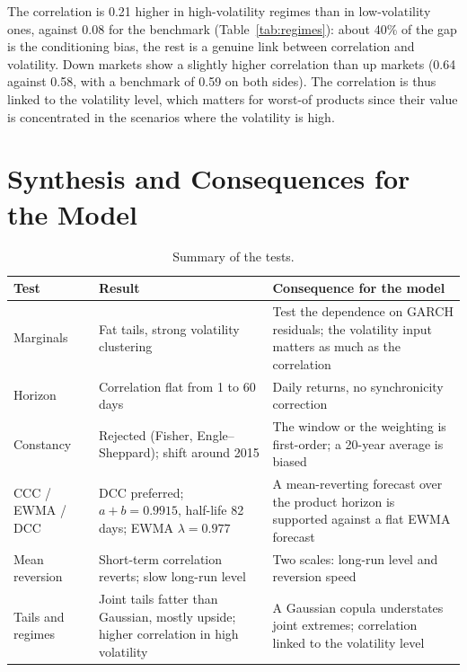 \documentclass[11pt,a4paper]{article}
\begin{document}
The correlation is 0.21 higher in high-volatility regimes than in low-volatility ones, against 0.08 for the benchmark
(Table~\ref{tab:regimes}): about 40\% of the gap is the conditioning bias, the rest is a genuine link between
correlation and volatility. Down markets show a slightly higher correlation than up markets (0.64 against 0.58, with
a benchmark of 0.59 on both sides). The correlation is thus linked to the volatility level, which matters for
worst-of products since their value is concentrated in the scenarios where the volatility is high.

\section{Synthesis and Consequences for the Model}\label{sec:synthesis}

\begin{table}[h]
\centering
\small
\begin{tabular}{@{}p{2.6cm}p{5.4cm}p{6.4cm}@{}}
\toprule
Test & Result & Consequence for the model \\
\midrule
Marginals & Fat tails, strong volatility clustering & Test the dependence on GARCH residuals; the volatility input matters as much as the correlation \\
Horizon & Correlation flat from 1 to 60 days & Daily returns, no synchronicity correction \\
Constancy & Rejected (Fisher, Engle--Sheppard); shift around 2015 & The window or the weighting is first-order; a 20-year average is biased \\
CCC / EWMA / DCC & DCC preferred; $a+b = 0.9915$, half-life 82 days; EWMA $\lambda = 0.977$ & A mean-reverting forecast over the product horizon is supported against a flat EWMA forecast \\
Mean reversion & Short-term correlation reverts; slow long-run level & Two scales: long-run level and reversion speed \\
Tails and regimes & Joint tails fatter than Gaussian, mostly upside; higher correlation in high volatility & A Gaussian copula understates joint extremes; correlation linked to the volatility level \\
\bottomrule
\end{tabular}
\caption{Summary of the tests.}
\label{tab:synthesis}
\end{table}
\end{document}
